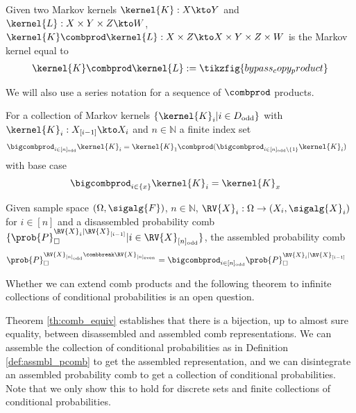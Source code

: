 \begin{definition}
Given two Markov kernels $\kernel{K}:X\kto Y$ and $\kernel{L}:X\times Y\times Z\kto W$, $\kernel{K}\combprod \kernel{L}:X\times Z\kto X\times Y\times Z\times W$ is the Markov kernel equal to
\begin{align}
    \kernel{K}\combprod \kernel{L} := \tikzfig{bypass_copy_product}
\end{align}
\end{definition}

We will also use a series notation for a sequence of $\combprod$ products.

\begin{definition}
For a collection of Markov kernels $\{\kernel{K}_i|i\in D_{\text{odd}}\}$ with $\kernel{K}_i:X_{[i-1]}\kto X_i$ and $n\in\mathbb{N}$ a finite index set
\begin{align}
    \bigcombprod_{i\in [n]_{\text{odd}}} \kernel{K}_i &= \kernel{K}_1 \combprod (\bigcombprod_{i\in [n]_{\text{odd}}\setminus\{1\}} \kernel{K}_i)
\end{align}
with base case
\begin{align}
    \bigcombprod_{i\in \{x\}} \kernel{K}_i &= \kernel{K}_x
\end{align}
\end{definition}

\begin{definition}\label{def:assmbl_pcomb}
Given sample space $(\Omega,\sigalg{F})$, $n\in \mathbb{N}$, $\RV{X}_{i}:\Omega\to (X_i,\sigalg{X}_i)$ for $i\in [n]$ and a disassembled probability comb $\{\prob{P}_\square^{\RV{X}_{i}|\RV{X}_{[i-1]}}|i\in \RV{X}_{[n]_{\text{odd}}}\}$, the assembled probability comb
\begin{align}
    \prob{P}_\square^{\RV{X}_{[n]_{\text{odd}}}\combbreak \RV{X}_{[n]_{\text{even}}}} &= \bigcombprod_{i\in [n]_{\text{odd}}}\prob{P}_\square^{\RV{X}_{i}|\RV{X}_{[i-1]}}
\end{align}
\end{definition}

Whether we can extend comb products and the following theorem to infinite collections of conditional probabilities is an open question.

Theorem \ref{th:comb_equiv} establishes that there is a bijection, up to almost sure equality, between disassembled and assembled comb representations. We can assemble the collection of conditional probabilities as in Definition \ref{def:assmbl_pcomb} to get the assembled representation, and we can disintegrate an assembled probability comb to get a collection of conditional probabilities. Note that we only show this to hold for discrete sets and finite collections of conditional probabilities.

